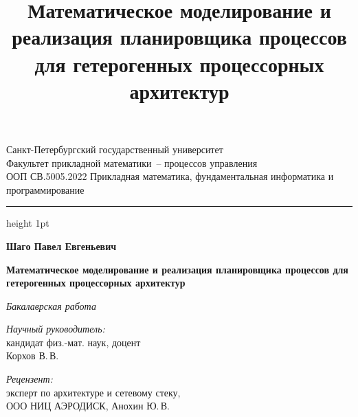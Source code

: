 \documentclass[aspectratio=169]{beamer}
\title{Математическое моделирование и
        реализация планировщика
процессов для гетерогенных процессорных архитектур}
\begin{document}
\begin{frame}[plain]
        \begin{center}
                \begin{shadowbox3}
                        {\scriptsize
                                Санкт-Петербургский государственный
                                университет \\ [0.1em]
                                Факультет прикладной математики~-- процессов
                                управления \\ [-0.4em]
                                ООП СВ.5005.2022 Прикладная
                                математика, фундаментальная информатика и
                                программирование
                        }
                \end{shadowbox3}
        \end{center}

        \vspace{0.3em}
        {\color{MainRed}\hrule height 1pt}
        \vspace{0.3em}

        \begin{center}
                {\small\color{MainRed}\textbf{Шаго Павел Евгеньевич}}

                \vspace{0.2em}
                \begin{shadowbox3}
                        {\bfseries
                                Математическое моделирование и
                                реализация планировщика
                        процессов для гетерогенных процессорных архитектур}
                \end{shadowbox3}

                \vspace{0.1em}
                {\small\itshape Бакалаврская работа}
        \end{center}
        \vspace{0.5em}

        \begin{minipage}{\textwidth}
                \begin{minipage}[t]{0.45\linewidth}
                        \raggedright
                        {\scriptsize
                                \textit{Научный руководитель:}\\[0.15em]
                                кандидат физ.-мат. наук, доцент\\
                        Корхов В.\,В.}
                \end{minipage}
                \hfill
                \begin{minipage}[t]{0.45\linewidth}
                        \raggedright
                        {\scriptsize
                                \textit{Рецензент:}\\[0.15em]
                                эксперт по архитектуре и сетевому стеку,\\
                        ООО НИЦ АЭРОДИСК, Анохин Ю.\,В.}
                \end{minipage}
        \end{minipage}


\end{frame}
\end{document}
